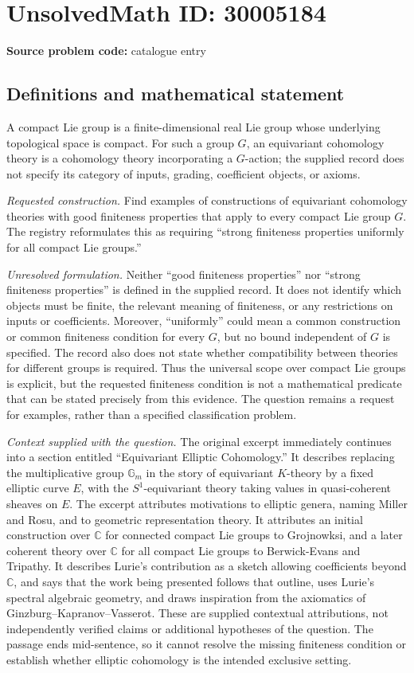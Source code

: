 \documentclass[11pt]{article}
\newcommand{\C}{\mathbb{C}}
\begin{document}
\section*{UnsolvedMath ID: 30005184}
\textbf{Source problem code:} catalogue entry
\subsection{Definitions and mathematical statement}
A compact Lie group is a finite-dimensional real Lie group whose underlying topological space is compact. For such a group \(G\), an equivariant cohomology theory is a cohomology theory incorporating a \(G\)-action; the supplied record does not specify its category of inputs, grading, coefficient objects, or axioms.

\emph{Requested construction.} Find examples of constructions of equivariant cohomology theories with good finiteness properties that apply to every compact Lie group \(G\). The registry reformulates this as requiring ``strong finiteness properties uniformly for all compact Lie groups.''

\emph{Unresolved formulation.} Neither ``good finiteness properties'' nor ``strong finiteness properties'' is defined in the supplied record. It does not identify which objects must be finite, the relevant meaning of finiteness, or any restrictions on inputs or coefficients. Moreover, ``uniformly'' could mean a common construction or common finiteness condition for every \(G\), but no bound independent of \(G\) is specified. The record also does not state whether compatibility between theories for different groups is required. Thus the universal scope over compact Lie groups is explicit, but the requested finiteness condition is not a mathematical predicate that can be stated precisely from this evidence. The question remains a request for examples, rather than a specified classification problem.

\emph{Context supplied with the question.} The original excerpt immediately continues into a section entitled ``Equivariant Elliptic Cohomology.'' It describes replacing the multiplicative group \(\mathbb G_m\) in the story of equivariant \(K\)-theory by a fixed elliptic curve \(E\), with the \(S^1\)-equivariant theory taking values in quasi-coherent sheaves on \(E\). The excerpt attributes motivations to elliptic genera, naming Miller and Rosu, and to geometric representation theory. It attributes an initial construction over \(\C\) for connected compact Lie groups to Grojnowksi, and a later coherent theory over \(\C\) for all compact Lie groups to Berwick-Evans and Tripathy. It describes Lurie's contribution as a sketch allowing coefficients beyond \(\C\), and says that the work being presented follows that outline, uses Lurie's spectral algebraic geometry, and draws inspiration from the axiomatics of Ginzburg--Kapranov--Vasserot. These are supplied contextual attributions, not independently verified claims or additional hypotheses of the question. The passage ends mid-sentence, so it cannot resolve the missing finiteness condition or establish whether elliptic cohomology is the intended exclusive setting.
\end{document}
